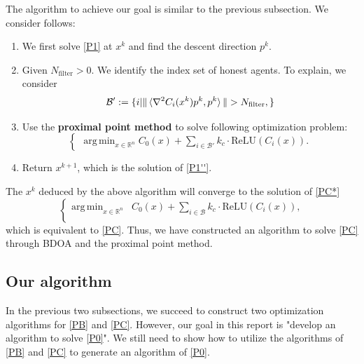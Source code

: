 \documentclass[conference]{IEEEtran}
\DeclareMathOperator*{\argmin}{arg\,min}
\begin{document}
The algorithm to achieve our goal is similar to the previous subsection. We consider follows:
\begin{enumerate}
    \item We first solve \eqref{P1} at $x^k$ and find the descent direction $p^k$.
    \item Given $N_{\text{filter}}>0$. We identify the index set of honest agents. To explain, we consider
    \begin{equation}
        \mathcal{B'}:=\{i|\|\braket{\nabla^2 C_i(x^k) p^k, p^k}\| > N_{\text{filter}},\}
    \end{equation}

    \item Use the \textbf{proximal point method} \cite{ppm} to solve following optimization problem:
    \begin{equation}
        \tag{P1''}
        \begin{cases}
        \argmin_{x\in \mathbb{R}^n}C_0(x) + 
        \sum_{i\in\mathcal{B'}} k_c \cdot\text{ReLU}(C_i(x)).
        \end{cases}
        \label{P1''}
    \end{equation}
    \item Return $x^{k+1}$, which is the solution of \eqref{P1''}.
\end{enumerate}
The $x^k$ deduced by the above algorithm will converge to the solution of \eqref{PC*}
\begin{equation*}
\tag{PC*}
\begin{cases}
    \argmin_{x\in \mathbb{R}^n} &C_0(x) + 
    \sum_{i \in \mathcal{B}} k_c\cdot\text{ReLU}(C_i(x)),\\
\end{cases}
\label{PC*}  
\end{equation*}
which is equivalent to \eqref{PC}. Thus, we have constructed an algorithm to solve \eqref{PC} through BDOA and the proximal point method.

\subsection{Our algorithm}
In the previous two subsections, we succeed to construct two optimization algorithms for \eqref{PB} and \eqref{PC}. However, our goal in this report is "develop an algorithm to solve \eqref{P0}". We still need to show how to utilize the algorithms of \eqref{PB} and \eqref{PC} to generate an algorithm of \eqref{P0}. 
\end{document}
